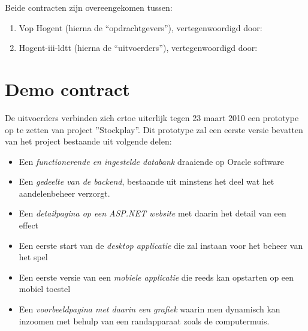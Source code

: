 Beide contracten zijn overeengekomen tussen:
\begin{enumerate}
\item{Vop Hogent (hierna de ``opdrachtgevers''), vertegenwoordigd door:
 }
\item{Hogent-iii-ldtt (hierna de ``uitvoerders''), vertegenwoordigd door:
 }
\end{enumerate}


%
%

\section{Demo contract}

De uitvoerders verbinden zich ertoe uiterlijk tegen 23 maart 2010 een prototype op te zetten van project ''Stockplay''. Dit prototype zal een eerste versie bevatten van het project bestaande uit volgende delen:
\begin{itemize}
\item Een \emph{functionerende en ingestelde databank} draaiende op Oracle software
\item Een \emph{gedeelte van de backend}, bestaande uit minstens het deel wat het aandelenbeheer verzorgt.
\item Een \emph{detailpagina op een ASP.NET website} met daarin het detail van een effect
\item Een eerste start van de \emph{desktop applicatie} die zal instaan voor het beheer van het spel
\item Een eerste versie van een \emph{mobiele applicatie} die reeds kan opstarten op een mobiel toestel
\item Een \emph{voorbeeldpagina met daarin een grafiek} waarin men dynamisch kan inzoomen met behulp van een randapparaat zoals de computermuis.
\end{itemize}

